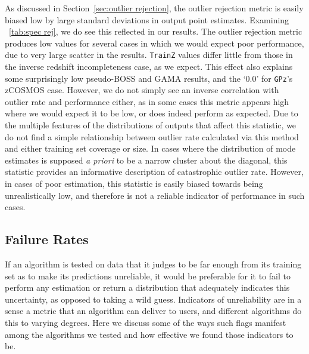 \documentclass[fleqn,usenatbib,useAMS]{mnras}
\newcommand{\PersonalTag}[3]{{\color{#2}{$^{#1}$ [#3}]}}
\newcommand{\aim}[1]{\PersonalTag{Alex}{violet}{#1}}
\newcommand{\alice}[1]{\PersonalTag{Alice}{olive}{#1}}
\newcommand{\rachel}[1]{\PersonalTag{Rachel}{orange}{#1}}
\newcommand{\refresponse}[1]{{\color{black}{#1}}}
\begin{document}
As discussed in Section~\ref{sec:outlier rejection}, the outlier rejection metric is easily biased low by large standard deviations in output point estimates. Examining \refresponse{Table}~\ref{tab:spec rej}, we do see this reflected in our results. The outlier rejection metric produces low values for several cases in which we would expect poor performance, due to very large scatter in the results.
\texttt{TrainZ} values differ little from those in the inverse redshift incompleteness case, as we expect. This effect also explains some surprisingly low pseudo-BOSS and GAMA results, and the `0.0' for \texttt{GPz}'s zCOSMOS case. 
However, we do not simply see an inverse correlation with outlier rate and performance either, as in some cases this metric appears high where we would expect it to be low, or does indeed perform as expected. 
Due to the multiple features of the distributions of outputs that affect this statistic, we do not find a simple relationship between outlier rate calculated via this method and either training set coverage or size. In cases where the distribution of mode estimates is supposed {\em a priori} to be a narrow cluster about the diagonal, this statistic provides an informative description of catastrophic outlier rate. However, in cases of poor estimation, this statistic is easily biased towards being unrealistically low, and therefore is not a reliable indicator of performance in such cases. 

\subsection{Failure Rates}
\label{sec:failure rates}

If an algorithm is tested on data that it judges to be far enough from its training set as to make its predictions unreliable, it would be preferable for it to fail to perform any estimation or return a distribution that adequately indicates this uncertainty, as opposed to taking a wild guess. 
Indicators of unreliability are in a sense a metric that an algorithm can deliver to users, and different algorithms do this to varying degrees.
Here we discuss some of the ways such flags manifest among the algorithms we tested and how effective we found those indicators to be.
\end{document}
